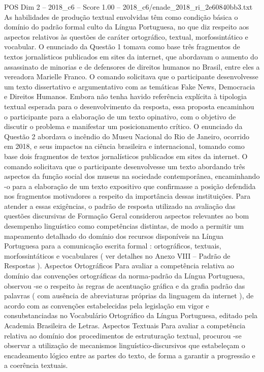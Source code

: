 \begin{textsample}{POS Dim 2 – 2018\_c6 – Score 1.00 – 2018\_c6/enade\_2018\_ri\_2e60840bb3.txt}
As habilidades de produção textual envolvidas têm como condição básica o domínio do padrão formal culto da Língua Portuguesa, no que diz respeito aos aspectos relativos às questões de caráter ortográfico, textual, morfossintático e vocabular.
O enunciado da Questão 1 tomava como base três fragmentos de textos jornalísticos publicados em sites da internet, que abordavam o aumento do assassinato de minorias e de defensores de direitos humanos no Brasil, entre eles a vereadora Marielle Franco.
O comando solicitava que o participante desenvolvesse um texto dissertativo e argumentativo com as temáticas Fake News, Democracia e Direitos Humanos.
Embora não tenha havido referência explícita à tipologia textual esperada para o desenvolvimento da resposta, essa proposta encaminhou o participante para a elaboração de um texto opinativo, com o objetivo de discutir o problema e manifestar um posicionamento crítico.
O enunciado da Questão 2 abordava o incêndio do Museu Nacional do Rio de Janeiro, ocorrido em 2018, e seus impactos na ciência brasileira e internacional, tomando como base dois fragmentos de textos jornalísticos publicados em sites da internet.
O comando solicitava que o participante desenvolvesse um texto abordando três aspectos da função social dos museus na sociedade contemporânea, encaminhando -o para a elaboração de um texto expositivo que confirmasse a posição defendida nos fragmentos motivadores a respeito da importância dessas instituições.
Para atender a essas exigências, o padrão de resposta utilizado na avaliação das questões discursivas de Formação Geral considerou aspectos relevantes ao bom desempenho linguístico como competências distintas, de modo a permitir um mapeamento detalhado do domínio dos recursos disponíveis na Língua Portuguesa para a comunicação escrita formal : ortográficos, textuais, morfossintáticos e vocabulares ( ver detalhes no Anexo VIII – Padrão de Respostas ).
Aspectos Ortográficos Para avaliar a competência relativa ao domínio das convenções ortográficas da norma-padrão da Língua Portuguesa, observou -se o respeito às regras de acentuação gráfica e da grafia padrão das palavras ( com ausência de abreviaturas próprias da linguagem da internet ), de acordo com as convenções estabelecidas pela legislação em vigor e consubstanciadas no Vocabulário Ortográfico da Língua Portuguesa, editado pela Academia Brasileira de Letras.
Aspectos Textuais Para avaliar a competência relativa ao domínio dos procedimentos de estruturação textual, procurou -se observar a utilização de mecanismos linguístico-discursivos que estabeleçam o encadeamento lógico entre as partes do texto, de forma a garantir a progressão e a coerência textuais.

\end{textsample}
